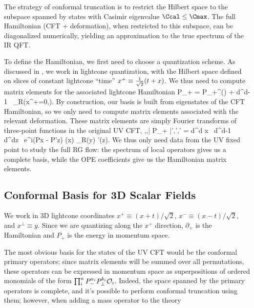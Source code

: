 The strategy of conformal truncation is to restrict the Hilbert space to the 
subspace spanned by states with Casimir eigenvalue $\Ccal \leq \Cmax$. The full 
Hamiltonian (CFT + deformation), when restricted to this subspace, can be 
diagonalized numerically, yielding an approximation to the true spectrum of the 
IR QFT.

To define the Hamiltonian, we first need to choose a quantization scheme. As 
discussed in \cite{Truncation}, we work in lightcone quantization, with the 
Hilbert space defined on slices of constant lightcone ``time'' 
$x^+ \equiv \frac{1}{\sqrt{2}}(t+x)$. We thus need to compute matrix elements for 
the associated lightcone Hamiltonian
\be
P_+ = P_+^{(\CFT)} + \lambda \int d^{d-1} \, \Ocal_R(x^+=0,).
\ee
By construction, our basis is built from eigenstates of the CFT Hamiltonian, so 
we only need to compute matrix elements associated with the relevant 
deformation. These matrix elements are simply Fourier transforms of three-point 
functions in the original UV CFT,
\be
\<\Ccal,,\mu| \de P_+ |\Ccal',',\mu'\> = \lambda \int d^d x \, d^{d-1} \, d^dz \, e^{i(P\cdot x - P'\cdot z)} \<\Ocal(x) \Ocal_R(y) \Ocal'(z)\>.
\label{eq:MatrixDef}
\ee
We thus only need data from the UV fixed point to study the full RG flow: the 
spectrum of local operators gives us a complete basis, while the OPE 
coefficients give us the Hamiltonian matrix elements.




\subsection{Conformal Basis for 3D Scalar Fields}

We work in 3D lightcone coordinates $x^+ \equiv (x + t)/\sqrt{2}$, 
$x^- \equiv (x - t)/\sqrt{2}$, and $x^\perp \equiv y$. Since we are quantizing 
along the $x^+$ direction, $\partial_+$ is the Hamiltonian and $P_+$ is the 
energy in momentum space. 

The most obvious basis for the states of the UV CFT would be the conformal 
primary operators; since matrix elements will be summed over all permutations, 
these operators can be expressed in momentum space as superpositions of ordered 
monomials of the form $\prod_i^n P_-^{a_i} P_\perp^{b_i} {\cal O}_i$. Indeed, the 
space spanned by the primary operators is complete, and it's possible to perform 
conformal truncation using them; however, when adding a mass operator to the 
theory

